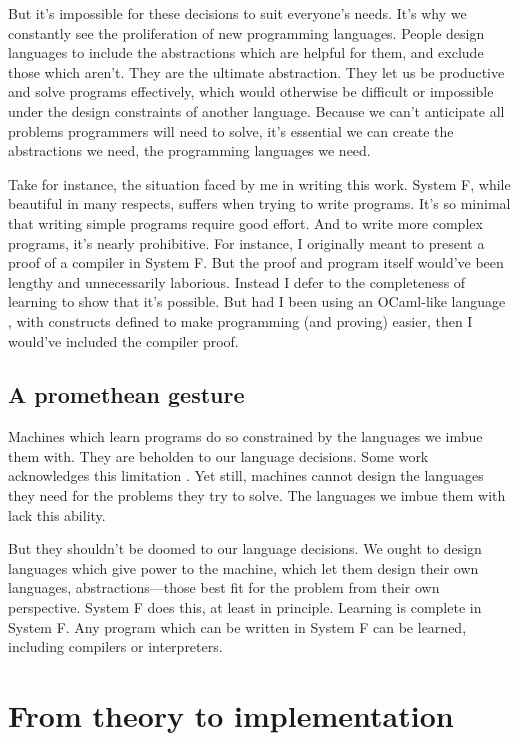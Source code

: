 But it's impossible for these decisions to suit everyone's needs. It's why we constantly see the proliferation of new programming languages. People design languages to include the abstractions which are helpful for them, and exclude those which aren't. They are the ultimate abstraction. They let us be productive and solve programs effectively, which would otherwise be difficult or impossible under the design constraints of another language. Because we can't anticipate all problems programmers will need to solve, it's essential we can create the abstractions we need, the programming languages we need. 

Take for instance, the situation faced by me in writing this work. System F, while beautiful in many respects, suffers when trying to write programs. It's so minimal that writing simple programs require good effort. And to write more complex programs, it's nearly prohibitive. For instance, I originally meant to present a proof of a compiler in System F. But the proof and program itself would've been lengthy and unnecessarily laborious. Instead I defer to the completeness of learning to show that it's possible. But had I been using an OCaml-like language \cite{leroy2014ocaml}, with constructs defined to make programming (and proving) easier, then I would've included the compiler proof. 

\subsection{A promethean gesture}

Machines which learn programs do so constrained by the languages we imbue them with. They are beholden to our language decisions. Some work acknowledges this limitation \cite{ellis2018learning}. Yet still, machines cannot design the languages they need for the problems they try to solve. The languages we imbue them with lack this ability.

But they shouldn't be doomed to our language decisions. We ought to design languages which give power to the machine, which let them design their own languages, abstractions---those best fit for the problem from their own perspective. System F does this, at least in principle. Learning is complete in System F. Any program which can be written in System F can be learned, including compilers or interpreters. 

% 

\section{From theory to implementation}

